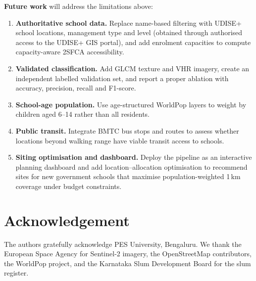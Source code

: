 \documentclass[conference]{IEEEtran}
\newcommand{\km}{\,km}
\begin{document}
\textbf{Future work} will address the limitations above:
\begin{enumerate}
\item \textbf{Authoritative school data.} Replace name-based filtering with UDISE+ school locations, management type and level (obtained through authorised access to the UDISE+ GIS portal), and add enrolment capacities to compute capacity-aware 2SFCA accessibility.
\item \textbf{Validated classification.} Add GLCM texture \cite{haralick1973} and VHR imagery, create an independent labelled validation set, and report a proper ablation with accuracy, precision, recall and F1-score.
\item \textbf{School-age population.} Use age-structured WorldPop layers to weight by children aged 6--14 rather than all residents.
\item \textbf{Public transit.} Integrate BMTC bus stops and routes to assess whether locations beyond walking range have viable transit access to schools.
\item \textbf{Siting optimisation and dashboard.} Deploy the pipeline as an interactive planning dashboard and add location--allocation optimisation to recommend sites for new government schools that maximise population-weighted 1\km{} coverage under budget constraints.
\end{enumerate}

\section*{Acknowledgement}
The authors gratefully acknowledge PES University, Bengaluru. We thank the European Space Agency for Sentinel-2 imagery, the OpenStreetMap contributors, the WorldPop project, and the Karnataka Slum Development Board for the slum register.
\end{document}
